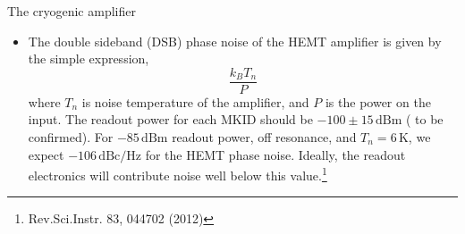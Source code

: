 \documentclass[ignorenonframetext,12pt]{beamer}
\begin{document}
\begin{frame}{The cryogenic amplifier}
				\begin{itemize}
								\item The double sideband (DSB) phase noise of the HEMT
												amplifier is given by the simple expression, 
												{\color{red}
												\begin{equation}
																\frac{k_B T_n}{P}
												\end{equation}} 
												where $T_n$ is noise temperature of the
												amplifier, and $P$ is the power on the input. The
												readout power for each MKID should be $-100 \pm
												15\,\text{dBm}$ ({\color{red} to be confirmed}). For
												$-85\,\text{dBm}$ readout power, off resonance, and $T_n
												= 6\,\text{K}$, we expect $-106\,\text{dBc/Hz}$ for the
												HEMT phase noise. Ideally, the readout electronics will
												contribute noise well below this value.\footnote{Rev.Sci.Instr. 83, 044702 (2012)}
				\end{itemize}
\end{frame}
\end{document}
